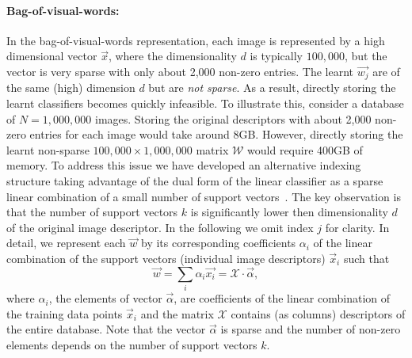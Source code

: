  \paragraph{Bag-of-visual-words:}
In the bag-of-visual-words representation, each image is represented by a high dimensional vector $\vec{x}$, where the dimensionality $d$ is typically $100,000$, but the vector is very sparse with only about 2,000 non-zero entries. 
The learnt $\vec{w_j}$ are of the same (high) dimension $d$ but are {\em not sparse}. As a result, directly storing the learnt classifiers becomes quickly infeasible.
  To illustrate this, consider a database of $N=1,000,000$ images. Storing the original descriptors with about 2,000 non-zero entries for each image would take around 8GB. However, directly storing the learnt non-sparse $100,000\times 1,000,000 $ matrix $\mathcal{W}$ would require 400GB of memory. %
  To address this issue we have developed an alternative indexing structure taking advantage of the dual form of the linear classifier as a sparse linear combination of a small number of support vectors~\cite{scholkopf2002learning}.   
 The key observation is that the number of support vectors $k$ is significantly lower then dimensionality $d$ of the original image descriptor. In the following we omit index $j$ for clarity.  In detail, we represent each $\vec{w}$ by its corresponding coefficients $\alpha_i$ of the linear combination of the support vectors (individual image descriptors) $\vec{x}_i$ such that
  \begin{equation}
        \vec{w}=\sum_{i} \alpha_i \vec{x_i} = \mathcal{X} \cdot \vec{\alpha},
        \label{eq:dual}
      \end{equation}
      \noindent
      where $\alpha_i$, the elements of vector $\vec{\alpha}$, are coefficients of the linear combination of the training data points $\vec{x}_i$ and the matrix $\mathcal{X}$ contains (as columns) descriptors of the entire database. Note that the vector $\vec{\alpha}$ is sparse and the number of non-zero elements depends on the number of support vectors $k$. 
